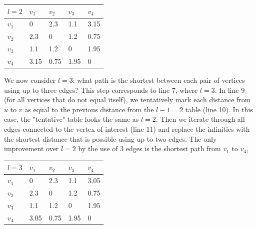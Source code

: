 \documentclass{article}
\begin{document}
\begin{table}[]
\begin{tabular}{|l|l|l|l|l|}
\hline
$l = 2$  & $v_1$                  & $v_2$                  & $v_3$                  & $v_4$                  \\ \hline
$v_1$ & 0                     & 2.3 & 1.1 & 3.15 \\ \hline
$v_2$ & 2.3 & 0                     & 1.2 & 0.75 \\ \hline
$v_3$ & 1.1 & 1.2 & 0                     & 1.95 \\ \hline
$v_4$ & 3.15 & 0.75 & 1.95 & 0                     \\ \hline
\end{tabular}
\end{table}

We now consider $l = 3$: what path is the shortest between each pair of vertices using up to three edges? This step corresponds to line 7, where $l = 3$. In line 9 (for all vertices that do not equal itself), we tentatively mark each distance from $u$ to $v$ as equal to the previous distance from the $l - 1 = 2$ table (line 10). In this case, the "tentative" table looks the same as $l = 2$. Then we iterate through all edges connected to the vertex of interest (line 11) and replace the infinities with the shortest distance that is possible using up to two edges. The only improvement over $l = 2$ by the use of 3 edges is the shortest path from $v_1$ to $v_4$, 

\begin{table}[]
\begin{tabular}{|l|l|l|l|l|}
\hline
$l = 3$  & $v_1$                  & $v_2$                  & $v_3$                  & $v_4$                  \\ \hline
$v_1$ & 0                     & 2.3 & 1.1 & 3.05 \\ \hline
$v_2$ & 2.3 & 0                     & 1.2 & 0.75 \\ \hline
$v_3$ & 1.1 & 1.2 & 0                     & 1.95 \\ \hline
$v_4$ & 3.05 & 0.75 & 1.95 & 0                     \\ \hline
\end{tabular}
\end{table}
\end{document}
